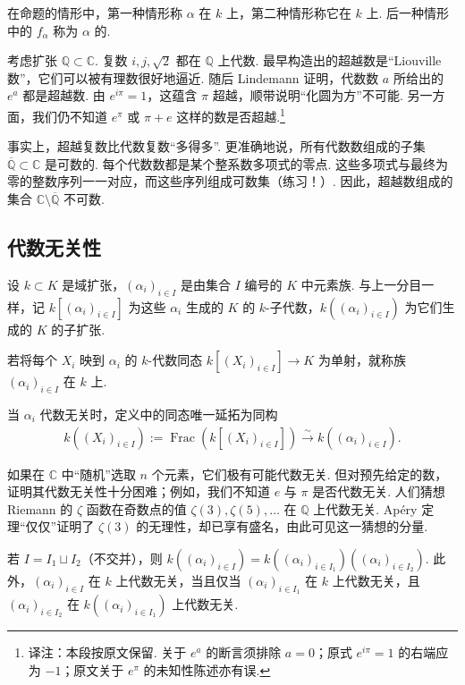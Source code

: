 \begin{definition*}
在命题的情形中，第一种情形称 $\alpha$ 在 $k$ 上，第二种情形称它在 $k$ 上. 后一种情形中的 $f_\alpha$ 称为 $\alpha$ 的.
\end{definition*}
\begin{example*}
考虑扩张 $\mathbb Q\subset\mathbb C$. 复数 $i,j,\sqrt2$ 都在 $\mathbb Q$ 上代数. 最早构造出的超越数是``Liouville 数''，它们可以被有理数很好地逼近. 随后 Lindemann 证明，代数数 $a$ 所给出的 $e^a$ 都是超越数. 由 $e^{i\pi}=1$，这蕴含 $\pi$ 超越，顺带说明``化圆为方''不可能. 另一方面，我们仍不知道 $e^\pi$ 或 $\pi+e$ 这样的数是否超越.\footnote{译注：本段按原文保留. 关于 $e^a$ 的断言须排除 $a=0$；原式 $e^{i\pi}=1$ 的右端应为 $-1$；原文关于 $e^\pi$ 的未知性陈述亦有误.}
\end{example*}
\begin{remark*}
事实上，超越复数比代数复数``多得多''. 更准确地说，所有代数数组成的子集 $\overline{\mathbb Q}\subset\mathbb C$ 是可数的. 每个代数数都是某个整系数多项式的零点. 这些多项式与最终为零的整数序列一一对应，而这些序列组成可数集（练习！）. 因此，超越数组成的集合 $\mathbb C\setminus\overline{\mathbb Q}$ 不可数.
\end{remark*}
\subsection{代数无关性}\label{sec:galois-2-1-3}
设 $k\subset K$ 是域扩张，$(\alpha_i)_{i\in I}$ 是由集合 $I$ 编号的 $K$ 中元素族. 与上一分目一样，记 $k[(\alpha_i)_{i\in I}]$ 为这些 $\alpha_i$ 生成的 $K$ 的 $k$-子代数，$k((\alpha_i)_{i\in I})$ 为它们生成的 $K$ 的子扩张.
\begin{definition*}
若将每个 $X_i$ 映到 $\alpha_i$ 的 $k$-代数同态 $k[(X_i)_{i\in I}]\longrightarrow K$ 为单射，就称族 $(\alpha_i)_{i\in I}$ 在 $k$ 上.
\end{definition*}
当 $\alpha_i$ 代数无关时，定义中的同态唯一延拓为同构
\begin{align*}
k((X_i)_{i\in I}):=\operatorname{Frac}(k[(X_i)_{i\in I}])\xrightarrow{\sim}k((\alpha_i)_{i\in I}).
\end{align*}
\begin{example*}
如果在 $\mathbb C$ 中``随机''选取 $n$ 个元素，它们极有可能代数无关. 但对预先给定的数，证明其代数无关性十分困难；例如，我们不知道 $e$ 与 $\pi$ 是否代数无关. 人们猜想 Riemann 的 $\zeta$ 函数在奇数点的值 $\zeta(3),\zeta(5),\ldots$ 在 $\mathbb Q$ 上代数无关. Apéry 定理``仅仅''证明了 $\zeta(3)$ 的无理性，却已享有盛名，由此可见这一猜想的分量.
\end{example*}
\begin{remark*}
若 $I=I_1\sqcup I_2$（不交并），则 $k((\alpha_i)_{i\in I})=k((\alpha_i)_{i\in I_1})((\alpha_i)_{i\in I_2})$. 此外，$(\alpha_i)_{i\in I}$ 在 $k$ 上代数无关，当且仅当 $(\alpha_i)_{i\in I_1}$ 在 $k$ 上代数无关，且 $(\alpha_i)_{i\in I_2}$ 在 $k((\alpha_i)_{i\in I_1})$ 上代数无关.
\end{remark*}
